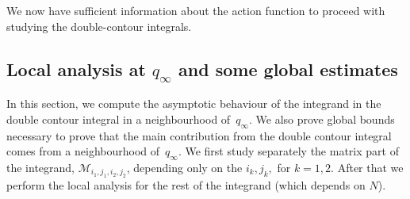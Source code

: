 \documentclass[11pt]{article}
\theoremstyle{plain}
\theoremstyle{definition}
\numberwithin{equation}{section}
\begin{document}
We now have sufficient information about the action function to proceed with studying the double-contour integrals. 
%

%



\subsection{Local analysis at $q_{\infty}$ and some global estimates}\label{sec:local_analysis}
In this section, we compute the asymptotic behaviour of the integrand in the double contour integral in a neighbourhood of~$q_\infty$. We also prove global bounds necessary to prove that the main contribution from the double contour integral comes from a neighbourhood of~$q_\infty$. We first study separately the matrix part of the  integrand, $\boldsymbol{\mathcal{M}}_{i_1,j_1,i_2,j_2}$, depending only on the $i_k, j_k,$ for $k=1,2$.
 After that we perform the local analysis for the rest of the integrand (which depends on $N$).
\end{document}
